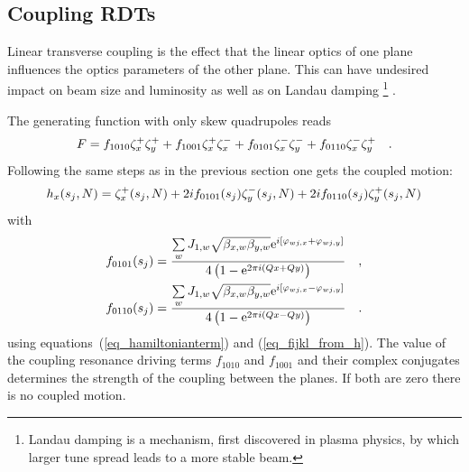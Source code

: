 
\subsection{Coupling RDTs}
\label{sec_coupling_rdts}

Linear transverse coupling is the effect that the linear optics of one plane influences the optics
parameters of the other plane.
This can have undesired impact on beam size and luminosity as well as on Landau damping%
\footnote{%
Landau damping is a mechanism, first discovered in plasma physics\cite{landau_landau_damp, landau_damp_revis}, %
by which larger tune spread leads to a more stable beam.%
}%
.

The generating function with only skew quadrupoles reads
%
\begin{equation}
    F = f_{1010} \zeta_x^+ \zeta_y^+  + f_{1001} \zeta_x^+ \zeta_x^- + f_{0101} \zeta_x^- \zeta_y^- + f_{0110} \zeta_x^- \zeta_y^+
    \quad .
\end{equation}
%
Following the same steps as in the previous section one gets the coupled motion:
%
\begin{equation}
    h_x(s_j,N) = \zeta_x^+(s_j,N) + 2i f_{0101}(s_j) \zeta_y^-(s_j,N) + 2i f_{0110}(s_j) \zeta_y^+(s_j,N)
    \label{eq_coupled_h_from_z}
\end{equation}
%
with
%
\begin{align}
    f_{0101}(s_j) &= \frac{
        \sum\limits_w J_{1,w} \sqrt{\beta_{x,w}\beta_{y,w}}\text{e}^{i\left[\varphi_{wj,x} + \varphi_{wj,y}\right]}
    }{
        4\left( 1- \text{e}^{2\pi i (Qx+Qy)} \right)
    } \quad , \notag \\
    f_{0110}(s_j) &= \frac{
        \sum\limits_w J_{1,w} \sqrt{\beta_{x,w}\beta_{y,w}}\text{e}^{i\left[\varphi_{wj,x} - \varphi_{wj,y}\right]}
    }{
        4\left( 1- \text{e}^{2\pi i (Qx-Qy)} \right)
    }
    \quad .
    \label{eq_f0101_f0110}
\end{align}
%
using equations~(\ref{eq_hamiltonianterm}) and (\ref{eq_fijkl_from_h}).
The value of the coupling resonance driving terms $f_{1010}$ and $f_{1001}$ and their complex conjugates
determines the strength of the coupling between the planes. 
If both are zero there is no coupled motion.

